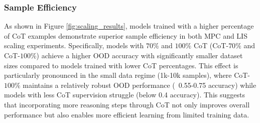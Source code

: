 \subsubsection{Sample Efficiency}
As shown in Figure \ref{fig:scaling_results}, models trained with a higher percentage of CoT examples demonstrate superior sample efficiency in both MPC and LIS scaling experiments. Specifically, models with $70\%$ and $100\%$ CoT (CoT-$70\%$ and CoT-$100\%$) achieve a higher OOD accuracy with significantly smaller dataset sizes compared to models trained with lower CoT percentages. This effect is particularly pronounced in the small data regime (1k-10k samples), where CoT-$100\%$ maintains a relatively robust OOD performance (~0.55-0.75 accuracy) while models with less CoT supervision struggle (below 0.4 accuracy). This suggests that incorporating more reasoning steps through CoT not only improves overall performance but also enables more efficient learning from limited training data.
